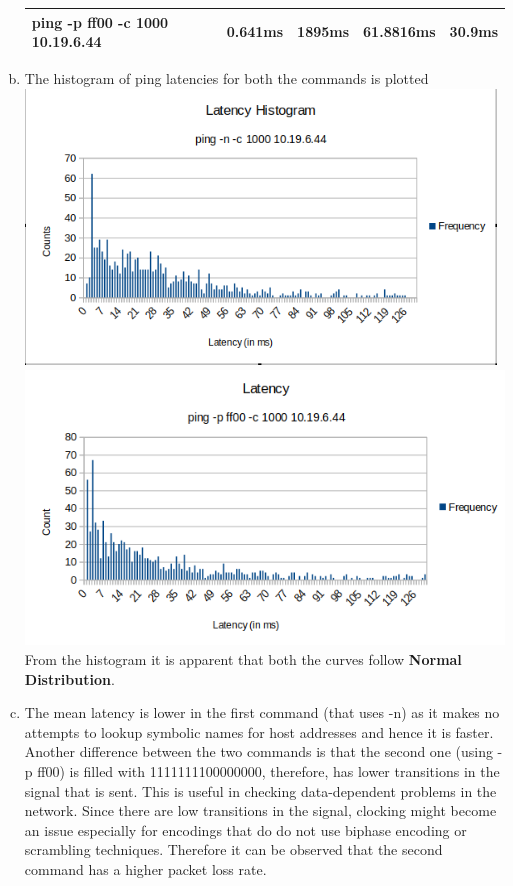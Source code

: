 \documentclass[a4paper,10pt]{article}
\begin{document}
\begin{enumerate}[a)]
\begin{tabularx}{0.95\textwidth}{|p{130pt}||X||X||X||p{90pt}|}
		ping -p ff00 -c 1000 10.19.6.44 & 0.641ms & 1895ms & 61.8816ms & 30.9ms \\ \hline
	\end{tabularx}
	\item
	The histogram of ping latencies for both the commands is plotted
	\\
	\centering
	\includegraphics[width=12.5cm]{lat1.png}
	\\
	\includegraphics[width=13.5cm]{lat2.png}
	\\
	\flushleft
	From the histogram it is apparent that both the curves follow \textbf{Normal Distribution}.
	\item
	The mean latency is lower in the first command (that uses -n) as it makes no attempts to lookup symbolic names for host addresses and hence it is faster. Another difference between the two commands is that the second one (using -p ff00) is filled with 1111111100000000, therefore, has lower transitions in the signal that is sent. This is useful in checking data-dependent problems in the network. Since there are low transitions in the signal, clocking might become an issue especially for encodings that do do not use biphase encoding or scrambling techniques. Therefore it can be observed that the second command has a higher packet loss rate.
\end{enumerate}
\end{document}
